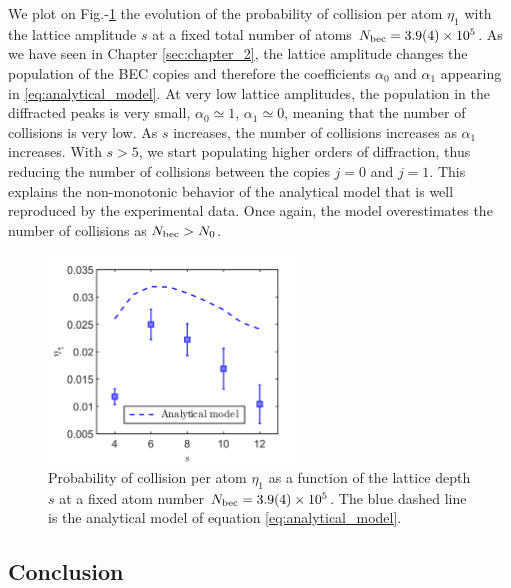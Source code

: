  We plot on Fig.-\ref{fig:ncoll_vs_s} the evolution of the probability of collision per atom $\eta_1$ with the lattice amplitude $s$ at a fixed total number of atoms $N_{\rm{bec}} = 3.9(4) \times 10^5$. As we have seen in Chapter \ref{sec:chapter_2}, the lattice amplitude changes the population of the BEC copies and therefore the coefficients $\alpha_0$ and $\alpha_1$ appearing in \ref{eq:analytical_model}. At very low lattice amplitudes, the population in the diffracted peaks is very small, $\alpha_0 \simeq 1$, $\alpha_1 \simeq 0$, meaning that the number of collisions is very low. As $s$ increases, the number of collisions increases as $\alpha_1$ increases. With $s > 5$, we start populating higher orders of diffraction, thus reducing the number of collisions between the copies $j=0$ and $j=1$. This explains the non-monotonic behavior of the analytical model that is well reproduced by the experimental data. Once again, the model overestimates the number of collisions as $N_{\rm{bec}} > N_0$.
 
 \begin{figure}
     \centering
     \includegraphics[width=0.6\textwidth]{Fig/Chapter3/ncoll_vs_s.png}
     \caption[Probability of collision per atom as a function of the lattice depth]{Probability of collision per atom $\eta_1$ as a function of the lattice depth $s$ at a fixed atom number $N_{\rm{bec}}=3.9(4) \times 10^5$. The blue dashed line is the analytical model of equation \ref{eq:analytical_model}.}
     \label{fig:ncoll_vs_s}
 \end{figure}

\subsection{Conclusion}


